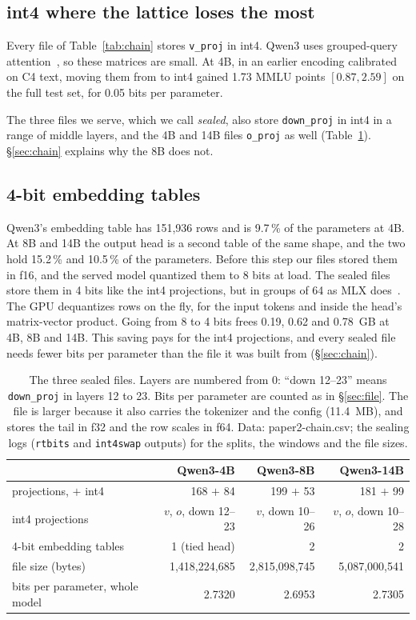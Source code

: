 \subsection{int4 where the lattice loses the most}
\label{sec:int4}

Every file of Table~\ref{tab:chain} stores \texttt{v\_proj} in int4. Qwen3
uses grouped-query attention~\citep{gqa2023}, so these matrices are small. At
4B, in an earlier encoding calibrated on C4 text, moving them from \Tetra{} to
int4 gained 1.73 MMLU points $[0.87, 2.59]$ on the full test set, for 0.05
bits per parameter.

The three files we serve, which we call \emph{sealed}, also store
\texttt{down\_proj} in int4 in a range of middle layers, and the 4B and 14B
files \texttt{o\_proj} as well (Table~\ref{tab:files}). \S\ref{sec:chain}
explains why the 8B does not.

\subsection{4-bit embedding tables}
\label{sec:q4emb}

Qwen3's embedding table has 151{,}936 rows and is 9.7\,\% of the parameters at
4B. At 8B and 14B the output head is a second table of the same shape, and the
two hold 15.2\,\% and 10.5\,\% of the parameters. Before this step our files
stored them in f16, and the served model quantized them to 8 bits at load. The
sealed files store them in 4 bits like the int4 projections, but in groups of
64 as MLX does~\citep{mlx2023}. The GPU dequantizes rows on the
fly, for the input tokens and inside the head's matrix-vector product. Going
from 8 to 4 bits frees 0.19, 0.62 and 0.78~GB at 4B, 8B and 14B. This saving
pays for the int4 projections, and every sealed file needs fewer bits per parameter
than the file it was built from (\S\ref{sec:chain}).

\begin{table}[t]
\centering\small
\caption{The three sealed files. Layers are numbered from 0: ``down 12--23''
means \texttt{down\_proj} in layers 12 to 23. Bits per parameter are counted as
in \S\ref{sec:file}. The file is larger because it also carries the tokenizer and the
config (11.4~MB), and stores the tail in f32 and the row scales in f64. Data:
paper2-chain.csv; the sealing logs (\texttt{rtbits} and \texttt{int4swap}
outputs) for the splits, the windows and the file sizes.}
\label{tab:files}
\begin{tabular}{lrrr}
\toprule
 & Qwen3-4B & Qwen3-8B & Qwen3-14B\\
\midrule
projections, \Tetra{} $+$ int4 & 168 $+$ 84 & 199 $+$ 53 & 181 $+$ 99\\
int4 projections & $v$, $o$, down 12--23 & $v$, down 10--26 & $v$, $o$, down 10--28\\
4-bit embedding tables & 1 (tied head) & 2 & 2\\
file size (bytes) & 1{,}418{,}224{,}685 & 2{,}815{,}098{,}745 & 5{,}087{,}000{,}541\\
bits per parameter, whole model & 2.7320 & 2.6953 & 2.7305\\
\bottomrule
\end{tabular}
\end{table}
